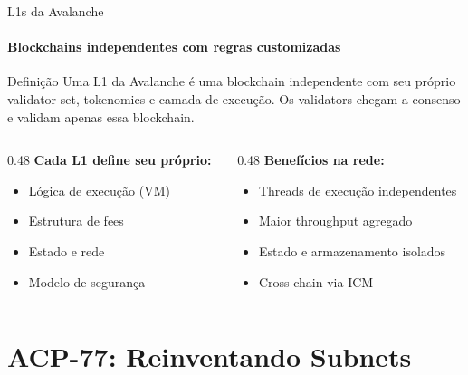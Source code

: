 \documentclass[aspectratio=169]{beamer}
\begin{document}
\begin{frame}{L1s da Avalanche}
	\framesubtitle{Blockchains independentes com regras customizadas}

	\begin{block}{Definição}
		Uma L1 da Avalanche é uma blockchain independente com seu próprio validator set,
		tokenomics e camada de execução. Os validators chegam a consenso e validam
		apenas essa blockchain.
	\end{block}

	\vspace{0.5em}
	\begin{columns}[t]
		\begin{column}{0.48\textwidth}
			\textbf{Cada L1 define seu próprio:}
			\begin{itemize}
				\item Lógica de execução (VM)
				\item Estrutura de fees
				\item Estado e rede
				\item Modelo de segurança
			\end{itemize}
		\end{column}
		\begin{column}{0.48\textwidth}
			\textbf{Benefícios na rede:}
			\begin{itemize}
				\item Threads de execução independentes
				\item Maior throughput agregado
				\item Estado e armazenamento isolados
				\item Cross-chain via ICM
			\end{itemize}
		\end{column}
	\end{columns}
\end{frame}

\section{ACP-77: Reinventando Subnets}
\end{document}
